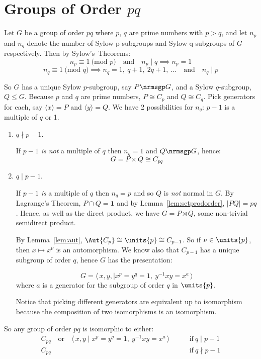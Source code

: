 \section{Groups of Order \(pq\)}
Let \(G\) be a group of order \(pq\) where \(p\), \(q\) are prime numbers with \(p > q\), and let \(n_p\) and \(n_q\)
denote the number of Sylow p-subgroups and Sylow q-subgroups of \(G\) respectively.
Then by Sylow's~Theorems:
\[n_p \equiv 1 \ \text{(mod \(p\))} \quad \text{and} \quad n_p \mid q \implies n_p = 1\]
\[n_q \equiv 1 \ \text{(mod \(q\))} \implies n_q = 1,\ q+1,\ 2q+1,\ \dots \quad \text{and} \quad n_q \mid p\]

So \(G\) has a unique Sylow \(p\)-subgroup, say \(P \nrmsgp G\), and a Sylow \(q\)-subgroup, \(Q \leqslant G\).
Because \(p\) and \(q\) are prime numbers, \(P \cong C_p\) and \(Q \cong C_q\).
Pick generators for each, say \(\langle x \rangle  = P\) and \(\langle y \rangle = Q\).
We have 2 possibilities for \(n_q\): \(p-1\) is a multiple of \(q\) or 1.

\begin{enumerate}
    \item \(q \nmid p - 1\).

        If \(p-1\) \emph{is not} a multiple of \(q\) then \(n_q = 1\) and \(Q \nrmsgp G\), hence:
        \[G = P \times Q \cong C_{pq}\]

    \item \( q \mid p - 1\).

        If \(p-1\) \emph{is} a multiple of \(q\) then \(n_q = p\) and so \(Q\) is \emph{not} normal in \(G\).
        By Lagrange's Theorem, \(P \cap Q = \bm{1}\) and by Lemma~\ref{lem:setprodorder}, \(|PQ| = pq\).
        Hence, as well as the direct product, we have \(G = P \rtimes Q\), some non-trivial semidirect product.

        By Lemma~\ref{lem:aut}, \(\Aut{C_p} \cong \units{p} \cong C_{p-1}\).
        So if \(\nu \in \units{p}\), then \(x \mapsto x^\nu\) is an automorphism.
        We know also that \(C_{p-1}\) has a unique subgroup of order \(q\),
        hence \(G\) has the presentation:

        \[G = \langle \, x, y, \mid x^p = y^q = 1,\ y^{-1}xy = x^a \, \rangle\]
        where \(a\) is a generator for the subgroup of order \(q\) in
        \(\units{p}\).

        Notice that picking different generators are equivalent up to isomorphism because the composition of two
        isomorphisms is an isomorphism.
\end{enumerate}

So any group of order \(pq\) is isomorphic to either:
\begin{equation*}
\begin{aligned}
    C_{pq} \quad \text{or} \quad \langle \, x, y \mid x^p = y^q = 1,\ y^{-1}xy
    = x^a \, \rangle \qquad &\text{if} \ q \mid p-1 \\
    C_{pq} \qquad &\text{if} \ q \nmid p-1
\end{aligned}
\end{equation*}
